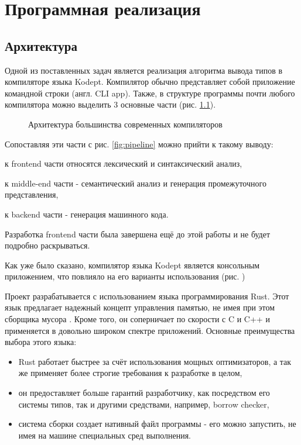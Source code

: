 \chapter{Программная реализация}
\label{ch:chap3_soft_architecture}
\section{Архитектура}
\label{sec:architecture}

Одной из поставленных задач является реализация алгоритма вывода типов в компиляторе языка Kodept.
Компилятор обычно представляет собой приложение командной строки (англ. CLI app).
Также, в структуре программы почти любого компилятора можно выделить 3 основные части (рис. \ref{fig:arch}).

\begin{figure}[h]
    \centering
    
    \caption{Архитектура большинства современных компиляторов}
    \label{fig:arch}
\end{figure}

Сопоставляя эти части с рис. \ref{fig:pipeline} можно прийти к такому выводу:
\begin{inparaenum}[1)]
    \item к frontend части относятся лексический и синтаксический анализ,
    \item к middle-end части - семантический анализ и генерация промежуточного представления,
    \item к backend части - генерация машинного кода.
\end{inparaenum}
Разработка frontend части была завершена ещё до этой работы и не будет подробно раскрываться.

Как уже было сказано, компилятор языка Kodept является консольным приложением, что повлияло на его варианты использования (рис. )



Проект разрабатывается с использованием языка программирования Rust.
Этот язык предлагает надежный концепт управления памятью, не имея при этом сборщика мусора \cite{RustMemory}.
Кроме того, он соперничает по скорости с C и C++ и применяется в довольно широком спектре приложений.
Основные преимущества выбора этого языка:
\begin{itemize}
    \item Rust работает быстрее за счёт использования мощных оптимизаторов, а так же применяет более строгие требования к разработке в целом,
    \item он предоставляет больше гарантий разработчику, как посредством его системы типов, так и другими средствами, например, borrow checker,
    \item система сборки создает нативный файл программы - его можно запустить, не имея на машине специальных сред выполнения.
\end{itemize}

